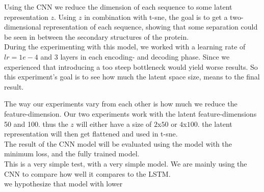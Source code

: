 Using the CNN we reduce the dimension of each sequence to some latent representation $z$. Using $z$ in combination with t-sne, the goal is to get a two-dimensional representation of each sequence, showing that some separation could be seen in between the secondary structures of the protein. \\

\noindent
During the experimenting with this model, we worked with a learning rate of $lr=1e-4$ and 3 layers in each encoding- and decoding phase. Since we experienced that introducing a too steep bottleneck would yield worse results. So this experiment's goal is to see how much the latent space size, means to the final result.

\noindent
The way our experiments vary from each other is how much we reduce the feature-dimension. Our two experiments work with the latent feature-dimensions 50 and 100. thus the $z$ will either have a size of $2$x$50$ or $4$x$100$. the latent representation will then get flattened and used in t-sne. \\

\noindent
The result of the CNN model will be evaluated using the model with the minimum loss, and the fully trained model. \\

\noindent
This is a very simple test, with a very simple model. We are mainly using the CNN to compare how well it compares to the LSTM. \\

\noindent
we hypothesize that model with lower